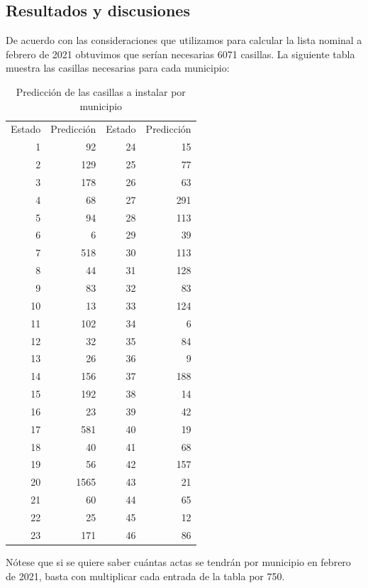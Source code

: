 \documentclass[12pt,letterpaper]{article}
\begin{document}
\small{\subsection*{Resultados y discusiones}}
\normalsize{De acuerdo con las consideraciones que utilizamos para calcular la lista nominal a febrero de 2021 obtuvimos que serían necesarias 6071 casillas. La siguiente tabla muestra las casillas necesarias para cada municipio:}
\begin{table}[H]
  \centering
  \caption{Predicción de las casillas a instalar por municipio}
    \begin{tabular}{rrrr}
    \multicolumn{1}{l}{Estado} & \multicolumn{1}{l}{Predicción} & \multicolumn{1}{l}{Estado} & \multicolumn{1}{l}{Predicción} \\
    1     & 92    & 24    & 15 \\
    2     & 129   & 25    & 77 \\
    3     & 178   & 26    & 63 \\
    4     & 68    & 27    & 291 \\
    5     & 94    & 28    & 113 \\
    6     & 6     & 29    & 39 \\
    7     & 518   & 30    & 113 \\
    8     & 44    & 31    & 128 \\
    9     & 83    & 32    & 83 \\
    10    & 13    & 33    & 124 \\
    11    & 102   & 34    & 6 \\
    12    & 32    & 35    & 84 \\
    13    & 26    & 36    & 9 \\
    14    & 156   & 37    & 188 \\
    15    & 192   & 38    & 14 \\
    16    & 23    & 39    & 42 \\
    17    & 581   & 40    & 19 \\
    18    & 40    & 41    & 68 \\
    19    & 56    & 42    & 157 \\
    20    & 1565  & 43    & 21 \\
    21    & 60    & 44    & 65 \\
    22    & 25    & 45    & 12 \\
    23    & 171   & 46    & 86 \\
    \end{tabular}%
  \label{tab:addlabel}%
\end{table}%
Nótese que si se quiere saber cuántas actas se tendrán por municipio en febrero de 2021, basta con multiplicar cada entrada de la tabla por 750. \\
\end{document}
